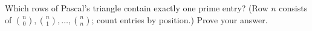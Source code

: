 Which rows of Pascal's triangle contain exactly one prime entry? (Row $n$ consists of $\binom n0,\binom n1,\dots,\binom nn$; count entries by position.) Prove your answer.
